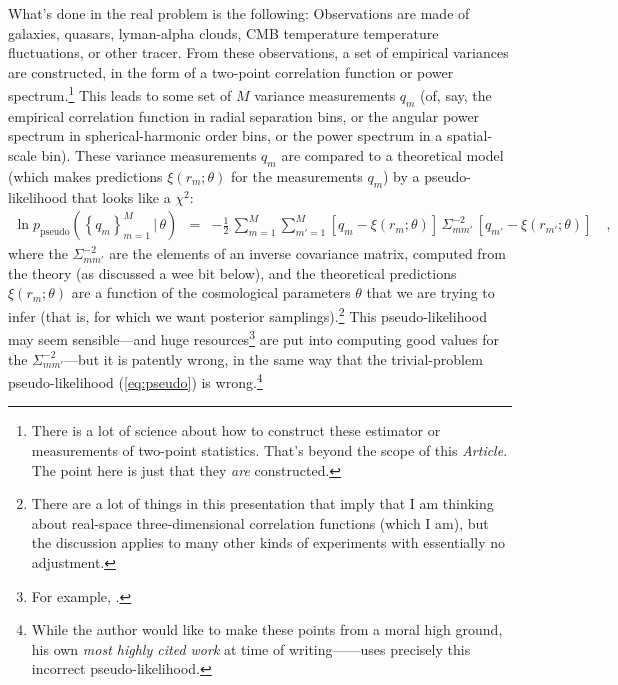 \documentclass[12pt, letterpaper, preprint]{aastex}
\newcommand{\setof}[1]{\left\{{#1}\right\}}
\newcommand{\given}{\,|\,}
\newcommand{\pseudo}{{\mathrm{pseudo}}}
\newcommand{\documentname}{\textsl{Article}}
\begin{document}
What's done in the real problem is the following:
Observations are made of galaxies, quasars, lyman-alpha clouds, CMB
temperature temperature fluctuations, or other tracer.
From these observations, a set of empirical variances are constructed, in the
form of a two-point correlation function or power
spectrum.\footnote{There is a lot of science about how to construct
  these estimator or measurements of two-point statistics. That's
  beyond the scope of this \documentname. The point here is just that they \emph{are}
  constructed.}
This leads to some set of $M$ variance measurements $q_m$ (of, say, the
empirical correlation function in radial separation bins, or the
angular power spectrum in spherical-harmonic order bins, or the power
spectrum in a spatial-scale bin).
These variance measurements $q_m$ are compared to a theoretical model (which makes
predictions $\xi(r_m;\theta)$ for the measurements $q_m$) by a
pseudo-likelihood that looks like a $\chi^2$:
\begin{eqnarray}
\ln p_\pseudo(\setof{q_m}_{m=1}^M\given\theta) &=&
 -\frac{1}{2}\,\sum_{m=1}^M\sum_{m'=1}^M [q_m - \xi(r_m;\theta)]\,\Sigma^{-2}_{mm'}\,[q_{m'} - \xi(r_{m'};\theta)]
\label{eq:pseudoreal}\quad ,
\end{eqnarray}
where the $\Sigma^{-2}_{mm'}$ are the elements of an inverse
covariance matrix, computed from the theory (as discussed a wee bit
below), and the theoretical predictions $\xi(r_m;\theta)$ are a
function of the cosmological parameters $\theta$ that we are trying to
infer (that is, for which we want posterior samplings).\footnote{There
  are a lot of things in this presentation that imply that I am
  thinking about real-space three-dimensional correlation functions
  (which I am), but the discussion applies to many other kinds of
  experiments with essentially no adjustment.}
This pseudo-likelihood may seem sensible---and huge resources\footnote{For
  example, \cite{percival}.} are put
into computing good values for the $\Sigma^{-2}_{mm'}$---but it is patently wrong, in the same
way that the trivial-problem pseudo-likelihood (\ref{eq:pseudo}) is
wrong.\footnote{While the author would like to make these points from
  a moral high ground, his own \emph{most highly cited work} at time of
  writing---\cite{eisenstein}---uses precisely this incorrect pseudo-likelihood.}
\end{document}
